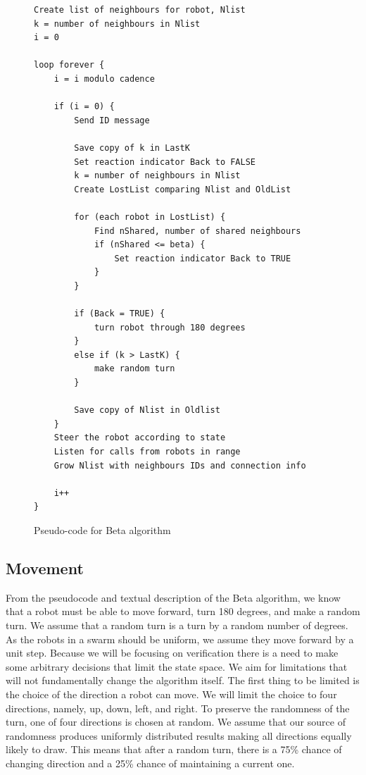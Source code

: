 \begin{figure}
\caption{Pseudo-code for Beta algorithm \cite{Nembrini2002}}
\begin{lstlisting}[style=code]
Create list of neighbours for robot, Nlist
k = number of neighbours in Nlist
i = 0

loop forever {
	i = i modulo cadence

	if (i = 0) {
		Send ID message

		Save copy of k in LastK
		Set reaction indicator Back to FALSE
		k = number of neighbours in Nlist
		Create LostList comparing Nlist and OldList

		for (each robot in LostList) {
			Find nShared, number of shared neighbours
			if (nShared <= beta) {
				Set reaction indicator Back to TRUE
			}
		}

		if (Back = TRUE) {
			turn robot through 180 degrees
		}
		else if (k > LastK) {
			make random turn
		}
		
		Save copy of Nlist in Oldlist
	}
	Steer the robot according to state
	Listen for calls from robots in range
	Grow Nlist with neighbours IDs and connection info

	i++
}
\end{lstlisting}
\label{fig:pseudocode}
\end{figure}



\subsection{Movement}
From the pseudocode and textual description of the Beta algorithm, we know that a robot must be able to move forward, turn 180 degrees, and make a random turn. We assume that a random turn is a turn by a random number of degrees. As the robots in a swarm should be uniform, we assume they move forward by a unit step. Because we will be focusing on verification there is a need to make some arbitrary decisions that limit the state space. We aim for limitations that will not fundamentally change the algorithm itself. The first thing to be limited is the choice of the direction a robot can move. We will limit the choice to four directions, namely, up, down, left, and right. To preserve the randomness of the turn, one of four directions is chosen at random. We assume that our source of randomness produces uniformly distributed results making all directions equally likely to draw. This means that after a random turn, there is a 75\% chance of changing direction and a 25\% chance of maintaining a current one. 

